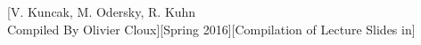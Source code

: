 \documentclass[12pt,a4paper]{article}
\begin{document}
[V. Kuncak, M. Odersky, R. Kuhn\\ Compiled By Olivier Cloux][Spring 2016][Compilation of Lecture Slides in]
\end{document}
